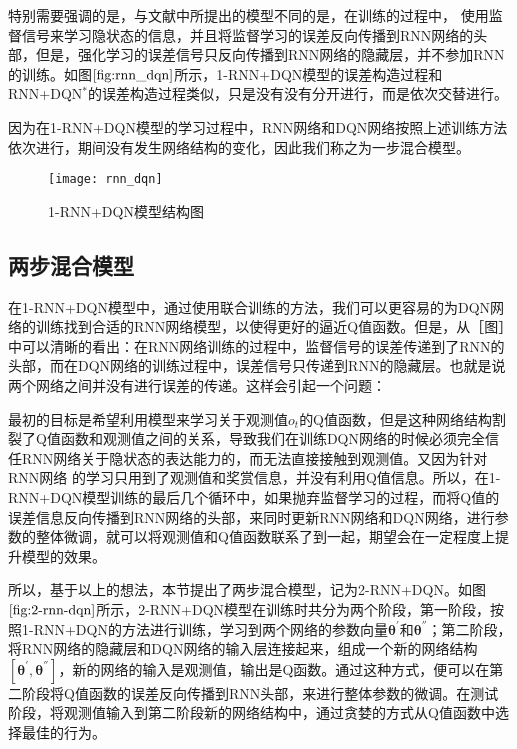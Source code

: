 特别需要强调的是，与文献\citep{hausknecht2015deep,narasimhan2015language}中所提出的模型不同的是，在训练的过程中，
使用监督信号来学习隐状态的信息，并且将监督学习的误差反向传播到RNN网络的头部，但是，强化学习的误差信号只反向传播到RNN网络的隐藏层，并不参加RNN的训练。如图$\ref{fig:rnn_dqn}$所示，1-RNN+DQN模型的误差构造过程和RNN+DQN$^{*}$的误差构造过程类似，只是没有没有分开进行，而是依次交替进行。

因为在1-RNN+DQN模型的学习过程中，RNN网络和DQN网络按照上述训练方法依次进行，期间没有发生网络结构的变化，因此我们称之为一步混合模型。
\begin{figure}[htbp]
\centering
\texttt{[image: rnn\_dqn]}
\caption{1-RNN+DQN模型结构图}
\label{fig:rnn_dqn}
\end{figure}

\subsection{两步混合模型}
在1-RNN+DQN模型中，通过使用联合训练的方法，我们可以更容易的为DQN网络的训练找到合适的RNN网络模型，以使得更好的逼近Q值函数。但是，从［图］中可以清晰的看出：在RNN网络训练的过程中，监督信号的误差传递到了RNN的头部，而在DQN网络的训练过程中，误差信号只传递到RNN的隐藏层。也就是说两个网络之间并没有进行误差的传递。这样会引起一个问题：

最初的目标是希望利用模型来学习关于观测值$o_{t}$的Q值函数，但是这种网络结构割裂了Q值函数和观测值之间的关系，导致我们在训练DQN网络的时候必须完全信任RNN网络关于隐状态的表达能力的，而无法直接接触到观测值。又因为针对RNN网络
的学习只用到了观测值和奖赏信息，并没有利用Q值信息。所以，在1-RNN+DQN模型训练的最后几个循环中，如果抛弃监督学习的过程，而将Q值的误差信息反向传播到RNN网络的头部，来同时更新RNN网络和DQN网络，进行参数的整体微调，就可以将观测值和Q值函数联系了到一起，期望会在一定程度上提升模型的效果。

所以，基于以上的想法，本节提出了两步混合模型，记为2-RNN+DQN。如图$\ref{fig:2-rnn-dqn}$所示，2-RNN+DQN模型在训练时共分为两个阶段，第一阶段，按照1-RNN+DQN的方法进行训练，学习到两个网络的参数向量$\bm{\theta}^{'}$和$\bm{\theta}^{''}$；第二阶段，将RNN网络的隐藏层和DQN网络的输入层连接起来，组成一个新的网络结构$[\bm{\theta}^{'},\bm{\theta}^{''}]$，新的网络的输入是观测值，输出是Q函数。通过这种方式，便可以在第二阶段将Q值函数的误差反向传播到RNN头部，来进行整体参数的微调。在测试阶段，将观测值输入到第二阶段新的网络结构中，通过贪婪的方式从Q值函数中选择最佳的行为。


